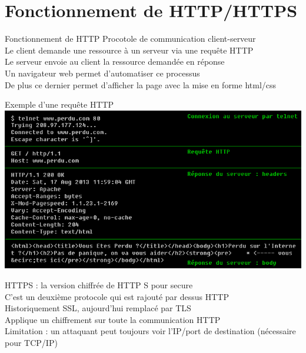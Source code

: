 \section{Fonctionnement de HTTP/HTTPS}


\begin{frame}{Fonctionnement de HTTP}
    Procotole de communication client-serveur \\
    Le client demande une ressource à un serveur via une requête HTTP \\
    Le serveur envoie au client la ressource demandée en réponse \\
    Un navigateur web permet d'automatiser ce processus \\
    De plus ce dernier permet d'afficher la page avec la mise en forme html/css

\end{frame}


\begin{frame}{Exemple d'une requête HTTP}
    \includegraphics[width=\linewidth]{../medias/perdu.png}
\end{frame}


\begin{frame}{HTTPS : la version chiffrée de HTTP}
    S pour secure \\
    C'est un deuxième protocole qui est rajouté par dessus HTTP \\
    Historiquement SSL, aujourd'hui remplacé par TLS \\
    Applique un chiffrement sur toute la communication HTTP \\

    Limitation : un attaquant peut toujours voir l'IP/port de destination (nécessaire pour TCP/IP)
\end{frame}



